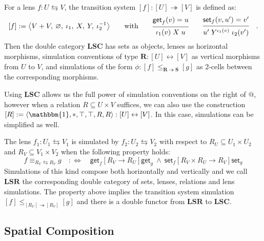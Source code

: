 \documentclass[acmsmall,screen,review,anonymous]{acmart}
\newcommand{\kw}[1]{\ensuremath{ \mathsf{#1} }}
\newcommand{\ifr}[1]{\mathrel{[{#1}]}}
\newcommand{\lensarrow}{\leftrightarrows}
\newcommand{\lensle}{\equiv}
\begin{document}
\begin{definition}
For a lens $f : U \lensarrow V$,
the transition system $[f] : [U] \twoheadrightarrow [V]$
is defined as:
\[
  [f] := \big\langle
    V + V, \: \varnothing, \:
    \iota_1, \: X, \: Y, \: \iota_2^{-1}
  \big\rangle
  \qquad \text{with} \qquad
  \begin{prooftree}
    \hypo{\kw{get}_f(v) = u}
    \infer1{\iota_1(v) \mathrel{X} u}
  \end{prooftree}
  \qquad
  \begin{prooftree}
    \hypo{\kw{set}_f(v, u') = v'}
    \infer1{u' \mathrel{Y^{\iota_1(v)}} \iota_2(v')}
  \end{prooftree}
  \quad.
\]
Then the double category $\mathbf{LSC}$ has
sets as objects,
lenses as horizontal morphisms,
simulation conventions of type $\mathbf{R} : [U] \leftrightarrow [V]$
as vertical morphisms from $U$ to $V$,
and simulations of the form
$\phi : [f] \le_{\mathbf{R} \twoheadrightarrow \mathbf{S}} [g]$
as 2-cells between the corresponding morphisms.
\end{definition}

Using $\mathbf{LSC}$ allows us the full power of simulation conventions
on the right of $\mathbin@$,
however when a relation $R \subseteq U \times V$ suffices,
we can also use the construction
$[R] := \langle \mathbbm{1}, *, \top, \top, R, R \rangle :
 [U] \leftrightarrow [V]$.
In this case, simulations can be simplified as well.

\begin{definition}
The lens
$f_1 : U_1 \lensarrow V_1$
is simulated by
$f_2 : U_2 \lensarrow V_2$
with respect to
$R_U \subseteq U_1 \times U_2$ and 
$R_V \subseteq V_1 \times V_2$
when the following property holds: 
\[
  f \lensle_{R_U \lensarrow R_V} g
  \quad :\Leftrightarrow \quad
  \kw{get}_f \ifr{R_V \rightarrow R_U} \kw{get}_g
  \:\wedge\:
  \kw{set}_f \ifr{R_V \times R_U \rightarrow R_V} \kw{set}_g
\]
Simulations of this kind compose
both horizontally and vertically
and we call $\mathbf{LSR}$ the corresponding double category of
sets, lenses, relations and lens simulations.
The property above implies
the transition system simulation
$[f] \le_{[R_U] \twoheadrightarrow [R_V]} [g]$
and there is a double functor from $\mathbf{LSR}$ to $\mathbf{LSC}$.
\end{definition}


\subsection{Spatial Composition} \label{sec:scomp:tr} \label{sec:scomp:sc} %
\end{document}
